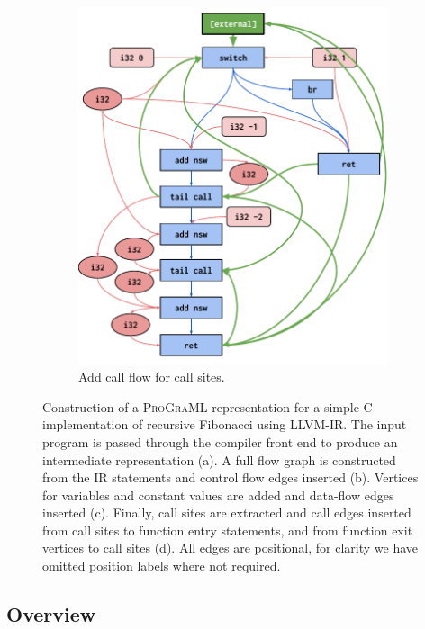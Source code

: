 \begin{figure}
\begin{subfigure}{.48\linewidth}
    \includegraphics[width=\linewidth]{images/D_Call}%
    \caption{Add call flow for call sites.}
    \label{subfigure:call_flow}%
  \end{subfigure}
  \caption{%
    Construction of a \textsc{ProGraML} representation for a simple C
    implementation of recursive Fibonacci using LLVM-IR. The input
    program is passed through the compiler front end to produce an
    intermediate representation (a). A full flow graph is constructed
    from the IR statements and control flow edges inserted
    (b). Vertices for variables and constant values are  added and
    data-flow edges inserted (c). Finally, call sites are extracted
    and call edges inserted from call sites to function entry
    statements, and from function exit vertices to call sites (d). All
    edges are positional, for clarity we have omitted position labels
    where not required.%
  }%
  \label{figure:graph_construction}%
\end{figure}

\subsection{Overview}

